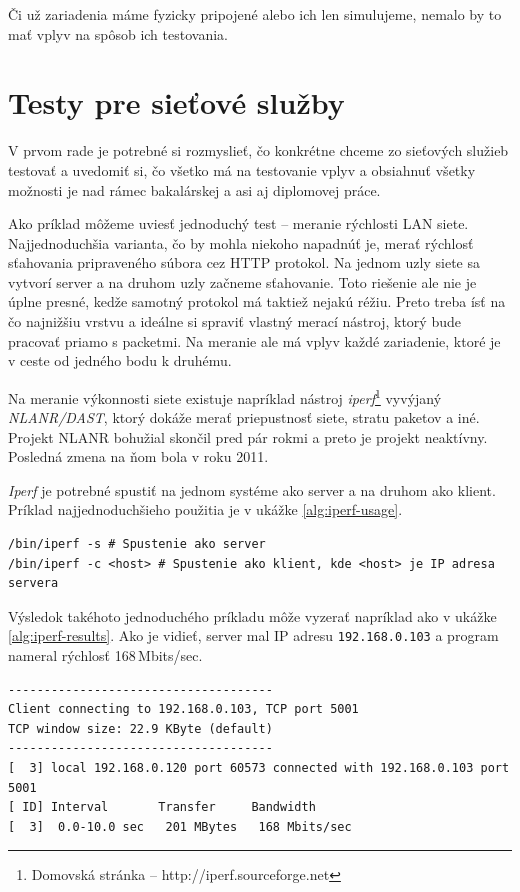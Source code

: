 Či už zariadenia máme fyzicky pripojené alebo ich len simulujeme, nemalo by to
mať vplyv na spôsob ich testovania.

%
%

\section{Testy pre sieťové služby}

V prvom rade je potrebné si rozmyslieť, čo konkrétne chceme zo sieťových
služieb testovať a uvedomiť si, čo všetko má na testovanie vplyv a obsiahnuť
všetky možnosti je nad rámec bakalárskej a asi aj diplomovej práce.

Ako príklad môžeme uviesť jednoduchý test -- meranie rýchlosti LAN siete.
Najjednoduchšia varianta, čo by mohla niekoho napadnúť je, merať rýchlosť
sťahovania pripraveného súbora cez HTTP protokol. Na jednom uzly siete sa
vytvorí server a na druhom uzly začneme sťahovanie. Toto riešenie ale nie je
úplne presné, kedže samotný protokol má taktiež nejakú réžiu. Preto treba ísť
na čo najnižšiu vrstvu a ideálne si spraviť vlastný merací nástroj, ktorý bude
pracovať priamo s packetmi. Na meranie ale má vplyv každé zariadenie, ktoré je
v ceste od jedného bodu k druhému.

%
%

Na meranie výkonnosti siete existuje napríklad nástroj
\emph{iperf}\footnote{Domovská stránka -- http://iperf.sourceforge.net}
vyvýjaný \emph{NLANR/DAST}, ktorý dokáže merať priepustnosť siete, stratu
paketov a iné.  Projekt NLANR bohužial skončil pred pár rokmi a preto je
projekt neaktívny.  Posledná zmena na ňom bola v roku 2011.

\emph{Iperf} je potrebné spustiť na jednom systéme ako server a na druhom ako
klient. Príklad najjednoduchšieho použitia je v ukážke \ref{alg:iperf-usage}.
\\
\renewcommand{\lstlistingname}{Ukážka}
\begin{lstlisting}[label=alg:iperf-usage,caption=Príklad použitia iperf]
/bin/iperf -s # Spustenie ako server
/bin/iperf -c <host> # Spustenie ako klient, kde <host> je IP adresa servera
\end{lstlisting}
\renewcommand{\lstlistingname}{\listingAlgoritmus}

Výsledok takéhoto jednoduchého príkladu môže vyzerať napríklad ako v ukážke
\ref{alg:iperf-results}. Ako je vidieť, server mal IP adresu
\texttt{192.168.0.103} a program nameral rýchlosť 168\,Mbits/sec.
\\
\renewcommand{\lstlistingname}{Ukážka}
\begin{lstlisting}[label=alg:iperf-results,caption=Výstup z programu iperf]
-------------------------------------
Client connecting to 192.168.0.103, TCP port 5001
TCP window size: 22.9 KByte (default)
-------------------------------------
[  3] local 192.168.0.120 port 60573 connected with 192.168.0.103 port 5001
[ ID] Interval       Transfer     Bandwidth
[  3]  0.0-10.0 sec   201 MBytes   168 Mbits/sec
\end{lstlisting}
\renewcommand{\lstlistingname}{\listingAlgoritmus}


